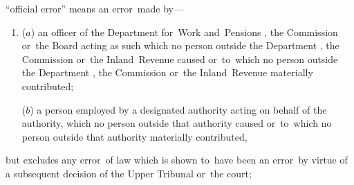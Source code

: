 \documentclass[12pt,a4paper]{article}
\begin{document}
\begin{enumerate}
    “official error” means an error~made by—
\begin{enumerate}\item[]
    ($a$) 
    an officer of the Department for~Work and~Pensions%
, the Commission  %
 or~the Board acting as such which no person outside the Department%
, the Commission  %
 or~the Inland~Revenue caused or~to~which no person outside the Department%
, the Commission  %
 or~the Inland~Revenue materially contributed;
 
   ($b$) 
    a person employed by a designated authority acting on behalf of the authority, which no person outside that authority caused or~to~which no person outside that authority materially contributed,
\end{enumerate}
    but excludes any error~of law which is shown to~have been an error~by virtue of a subsequent decision of 
the Upper Tribunal  %
or~the court;


%




\end{enumerate}
\end{document}
